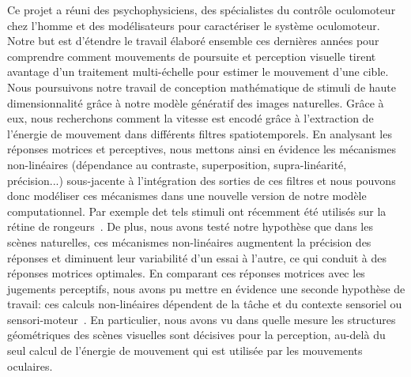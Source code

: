 Ce projet a réuni des psychophysiciens, des spécialistes du contrôle oculomoteur chez l'homme et des modélisateurs pour caractériser le système oculomoteur. Notre but est d'étendre le travail élaboré ensemble ces dernières années pour comprendre comment mouvements de poursuite et perception visuelle tirent avantage d'un traitement multi-échelle pour estimer le mouvement d'une cible. Nous poursuivons notre travail de conception mathématique de stimuli de haute dimensionnalité grâce à notre modèle génératif des images naturelles. Grâce à eux, nous recherchons comment la vitesse est encodé grâce à l'extraction de l'énergie de mouvement dans différents filtres spatiotemporels. En analysant les réponses motrices et perceptives, nous mettons ainsi en évidence les mécanismes non-linéaires (dépendance au contraste, superposition, supra-linéarité, précision...) sous-jacente à l'intégration des sorties de ces filtres et nous pouvons donc modéliser ces mécanismes dans une nouvelle version de notre modèle computationnel. Par exemple det tels stimuli ont récemment été utilisés sur la rétine de rongeurs~\citep{Ravello19}. De plus, nous avons testé notre hypothèse que dans les scènes naturelles, ces mécanismes non-linéaires augmentent la précision des réponses et diminuent leur variabilité d'un essai à l'autre, ce qui conduit à des réponses motrices optimales. En comparant ces réponses motrices avec les jugements perceptifs, nous avons pu mettre en évidence une seconde hypothèse de travail: ces calculs non-linéaires dépendent de la tâche et du contexte sensoriel ou sensori-moteur~\citep{Simoncini12}. En particulier, nous avons vu dans quelle mesure les structures géométriques des scènes visuelles sont décisives pour la perception, au-delà du seul calcul de l'énergie de mouvement qui est utilisée par les mouvements oculaires. %
